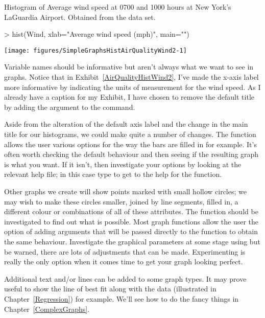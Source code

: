 \begin{exhibit} 
\begin{center} 
\caption{Histogram of Average wind speed at 0700 and 1000 hours at New York's LaGuardia Airport. Obtained from the  data set.} 
\label{AirQualityHistWind2} 
\begin{Schunk}
\begin{Sinput}
> hist(Wind, xlab="Average wind speed (mph)", main="") 
\end{Sinput}

\texttt{[image: figures/SimpleGraphsHistAirQualityWind2-1]} \end{Schunk}
\end{center} 
\end{exhibit} 
 
Variable names should be informative but aren't always what we want to see in graphs. Notice that in Exhibit~\ref{AirQualityHistWind2}, I've made the x-axis label more informative by indicating the units of measurement for the wind speed. As I already have a caption for my Exhibit, I have chosen to remove the default title by adding the argument  to the  command. 
 
Aside from the alteration of the default axis label and the change in the main title for our histograms, we could make quite a number of changes. The  function allows the user various options for the way the bars are filled in for example. It's often worth checking the default behaviour and then seeing if the resulting graph is what you want. If it isn't, then investigate your options by looking at the relevant help file; in this case type  to get to the help for the  function. 
 
 Other graphs we create will show points marked with small hollow circles; we may wish to make these circles smaller, joined by line segments, filled in, a different colour or combinations of all of these attributes. The  function should be investigated to find out what is possible. Most graph functions allow the user the option of adding arguments that will be passed directly to the  function to obtain the same behaviour. Investigate the graphical parameters at some stage using  but be warned, there are lots of adjustments that can be made. Experimenting is really the only option when it comes time to get your graph looking perfect. 
 
Additional text and/or lines can be added to some graph types. It may prove useful to show the line of best fit along with the data (illustrated in Chapter~\ref{Regression}) for example. We'll see how to do the fancy things in Chapter~\ref{ComplexGraphs}. 
 
